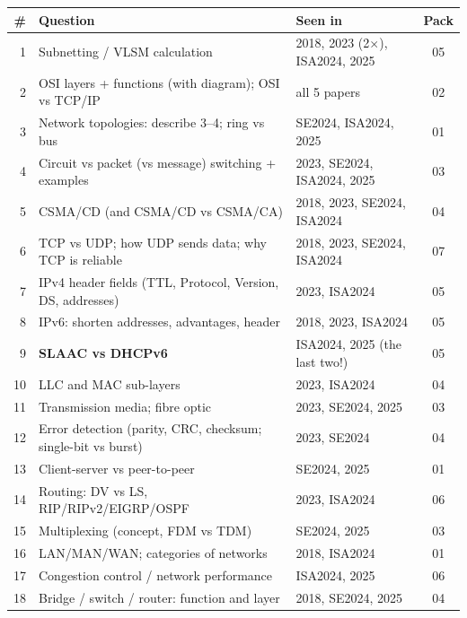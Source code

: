 \documentclass[10pt]{article}
\begin{document}
\begin{center}\small
\begin{tabularx}{\linewidth}{@{}rXlc@{}}
\toprule
\# & \textbf{Question} & \textbf{Seen in} & \textbf{Pack}\\\midrule
1 & Subnetting / VLSM calculation & 2018, 2023 (2$\times$), ISA2024, 2025 & 05\\
2 & OSI layers + functions (with diagram); OSI vs TCP/IP & all 5 papers & 02\\
3 & Network topologies: describe 3--4; ring vs bus & SE2024, ISA2024, 2025 & 01\\
4 & Circuit vs packet (vs message) switching + examples & 2023, SE2024, ISA2024, 2025 & 03\\
5 & CSMA/CD (and CSMA/CD vs CSMA/CA) & 2018, 2023, SE2024, ISA2024 & 04\\
6 & TCP vs UDP; how UDP sends data; why TCP is reliable & 2018, 2023, SE2024, ISA2024 & 07\\
7 & IPv4 header fields (TTL, Protocol, Version, DS, addresses) & 2023, ISA2024 & 05\\
8 & IPv6: shorten addresses, advantages, header & 2018, 2023, ISA2024 & 05\\
9 & \textbf{SLAAC vs DHCPv6} & ISA2024, 2025 (the last two!) & 05\\
10 & LLC and MAC sub-layers & 2023, ISA2024 & 04\\
11 & Transmission media; fibre optic & 2023, SE2024, 2025 & 03\\
12 & Error detection (parity, CRC, checksum; single-bit vs burst) & 2023, SE2024 & 04\\
13 & Client-server vs peer-to-peer & SE2024, 2025 & 01\\
14 & Routing: DV vs LS, RIP/RIPv2/EIGRP/OSPF & 2023, ISA2024 & 06\\
15 & Multiplexing (concept, FDM vs TDM) & SE2024, 2025 & 03\\
16 & LAN/MAN/WAN; categories of networks & 2018, ISA2024 & 01\\
17 & Congestion control / network performance & ISA2024, 2025 & 06\\
18 & Bridge / switch / router: function and layer & 2018, SE2024, 2025 & 04\\
\bottomrule
\end{tabularx}
\end{center}
\end{document}
